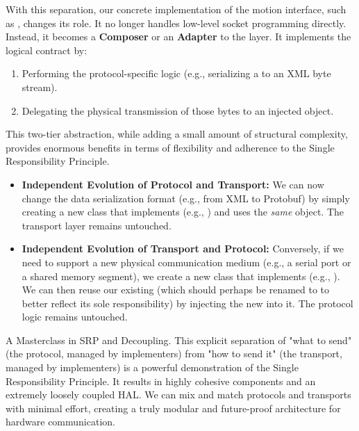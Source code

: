 With this separation, our concrete implementation of the motion interface, such as , changes its role. It no longer handles low-level socket programming directly. Instead, it becomes a \textbf{Composer} or an \textbf{Adapter} to the  layer. It implements the logical  contract by:
\begin{enumerate}
    \item Performing the protocol-specific logic (e.g., serializing a  to an XML byte stream).
    \item Delegating the physical transmission of those bytes to an injected  object.
\end{enumerate}




This two-tier abstraction, while adding a small amount of structural complexity, provides enormous benefits in terms of flexibility and adherence to the Single Responsibility Principle.
\begin{itemize}
    \item \textbf{Independent Evolution of Protocol and Transport:} We can now change the data serialization format (e.g., from XML to Protobuf) by simply creating a new class that implements  (e.g., ) and uses the \textit{same}  object. The transport layer remains untouched.
    \item \textbf{Independent Evolution of Transport and Protocol:} Conversely, if we need to support a new physical communication medium (e.g., a serial port or a shared memory segment), we create a new class that implements  (e.g., ). We can then reuse our existing  (which should perhaps be renamed to  to better reflect its sole responsibility) by injecting the new  into it. The protocol logic remains untouched.
\end{itemize}

\begin{principlebox}{A Masterclass in SRP and Decoupling.}
    This explicit separation of "what to send" (the protocol, managed by  implementers) from "how to send it" (the transport, managed by  implementers) is a powerful demonstration of the Single Responsibility Principle. It results in highly cohesive components and an extremely loosely coupled HAL. We can mix and match protocols and transports with minimal effort, creating a truly modular and future-proof architecture for hardware communication.
\end{principlebox}

